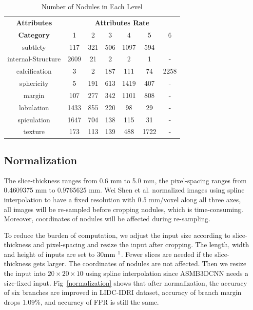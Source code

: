 \documentclass[runningheads]{llncs}
\begin{document}
\begin{table}[htb]
\caption{Number of  Nodules in Each Level}
\begin{center}
\begin{tabular}{|c|c|c|c|c|c|c|}
\hline
\textbf{Attributes}&\multicolumn{6}{|c|}{\textbf{Attributes Rate}} \\
\cline{2-7}
\textbf{Category}& 1&2&3&4&5&6\\
\hline
subtlety&117&321&506&1097&594&-\\
internal-Structure&2609&21&2&2&1&-\\
calcification&3&2&187&111&74&2258\\
sphericity&5&191&613&1419&407& -\\
margin& 107&277&342&1101&808& - \\
lobulation&1433&855&220&98&29& - \\
spiculation&1647&704&138&115&31& - \\
texture&173&113&139&488&1722& - \\
\hline
\end{tabular}
\vspace{-0.5cm}
\label{tab3}
\end{center}

\end{table}


\subsection{Normalization}
The slice-thickness ranges from 0.6 mm to 5.0 mm, the pixel-spacing ranges from 0.4609375 mm to 0.9765625 mm. Wei Shen et al. \cite{Shen2017Multi} normalized images using spline interpolation to have a fixed resolution with 0.5 mm/voxel along all three axes, all images will be re-sampled before cropping nodules, which is time-consuming. Moreover, coordinates of nodules will be affected during re-sampling.

To reduce the burden of computation, we adjust the input size according to slice-thickness and pixel-spacing and resize the input after cropping. The length, width and height of inputs are set to 30mm  $\footnote[1]{In clinical, nodules larger than 30mm in diameter are called lung masses and will not be discussed here}$. 
Fewer slices are needed if the slice-thickness gets larger.
The coordinates of nodules are not affected.
Then we resize the input into $20\times20\times10$ using spline interpolation since ASMB3DCNN needs a size-fixed input. Fig~\ref{normalization} shows that after normalization, the accuracy of six branches are improved in LIDC-IDRI dataset, accuracy of branch margin drops 1.09\%, and accuracy of FPR is still the same.
\end{document}
